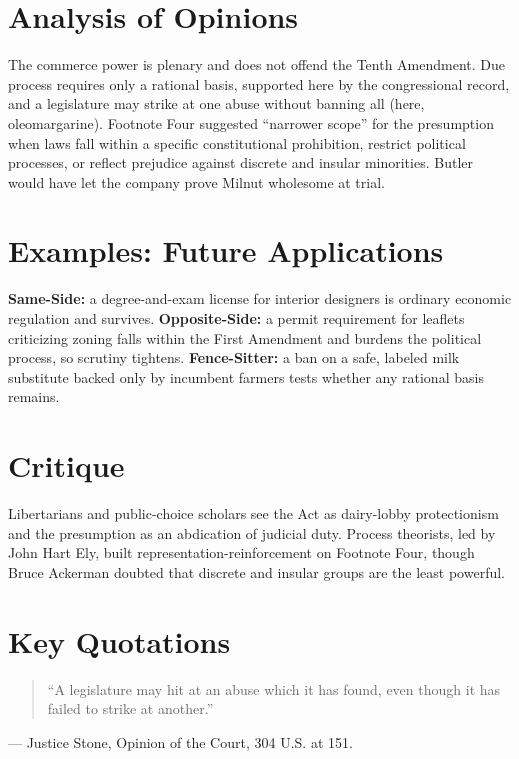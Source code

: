 \documentclass[12pt]{article}
\begin{document}
\section{Analysis of Opinions}
The commerce power is plenary and does not offend the Tenth Amendment. Due process requires only a rational basis, supported here by the congressional record, and a legislature may strike at one abuse without banning all (here, oleomargarine). Footnote Four suggested ``narrower scope'' for the presumption when laws fall within a specific constitutional prohibition, restrict political processes, or reflect prejudice against discrete and insular minorities. Butler would have let the company prove Milnut wholesome at trial.

\section{Examples: Future Applications}
\textbf{Same-Side:} a degree-and-exam license for interior designers is ordinary economic regulation and survives. \textbf{Opposite-Side:} a permit requirement for leaflets criticizing zoning falls within the First Amendment and burdens the political process, so scrutiny tightens. \textbf{Fence-Sitter:} a ban on a safe, labeled milk substitute backed only by incumbent farmers tests whether any rational basis remains.

\section{Critique}
Libertarians and public-choice scholars see the Act as dairy-lobby protectionism and the presumption as an abdication of judicial duty. Process theorists, led by John Hart Ely, built representation-reinforcement on Footnote Four, though Bruce Ackerman doubted that discrete and insular groups are the least powerful.

\section{Key Quotations}
\begin{quote}
``A legislature may hit at an abuse which it has found, even though it has failed to strike at another.''
\end{quote}
\noindent --- Justice Stone, Opinion of the Court, 304 U.S. at 151.
\end{document}
